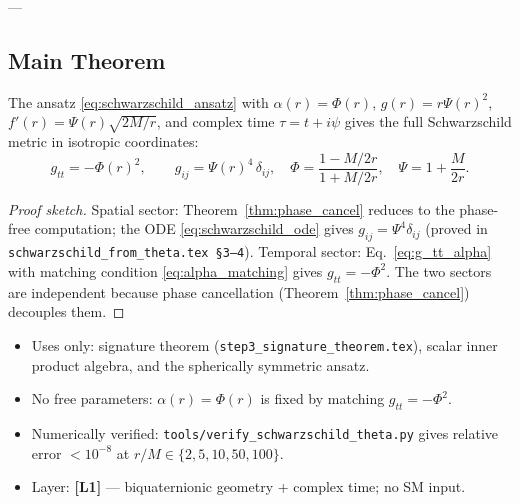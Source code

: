 ---

\subsection{Main Theorem}

\begin{theorem}
\label{thm:schwarzschild_full}
The ansatz \eqref{eq:schwarzschild_ansatz} with $\alpha(r) = \Phi(r)$,
$g(r) = r\Psi(r)^2$, $f'(r) = \Psi(r)\sqrt{2M/r}$, and complex time
$\tau = t + i\psi$ gives the full Schwarzschild metric in isotropic coordinates:
\begin{equation}
  \boxed{g_{tt} = -\Phi(r)^2,\qquad
  g_{ij} = \Psi(r)^4\,\delta_{ij},}
  \quad \Phi = \frac{1-M/2r}{1+M/2r},\quad \Psi = 1+\frac{M}{2r}.
  \label{eq:schwarzschild_full}
\end{equation}
\end{theorem}

\begin{proof}[Proof sketch]
Spatial sector: Theorem~\ref{thm:phase_cancel} reduces to the phase-free
computation; the ODE \eqref{eq:schwarzschild_ode} gives $g_{ij}=\Psi^4\delta_{ij}$
(proved in \texttt{schwarzschild\_from\_theta.tex §3–4}).
Temporal sector: Eq.~\eqref{eq:g_tt_alpha} with matching condition
\eqref{eq:alpha_matching} gives $g_{tt}=-\Phi^2$.
The two sectors are independent because phase cancellation
(Theorem~\ref{thm:phase_cancel}) decouples them.
\end{proof}

\begin{tcolorbox}[colback=green!5!white,colframe=green!75!black,
  title={Self-Containedness Check}]
\begin{itemize}
  \item Uses only: signature theorem (\texttt{step3\_signature\_theorem.tex}),
    scalar inner product algebra, and the spherically symmetric ansatz.
  \item No free parameters: $\alpha(r) = \Phi(r)$ is fixed by matching
    $g_{tt} = -\Phi^2$.
  \item Numerically verified: \texttt{tools/verify\_schwarzschild\_theta.py}
    gives relative error $< 10^{-8}$ at $r/M \in \{2,5,10,50,100\}$.
  \item Layer: \textbf{[L1]} — biquaternionic geometry + complex time; no SM input.
\end{itemize}
\end{tcolorbox}

